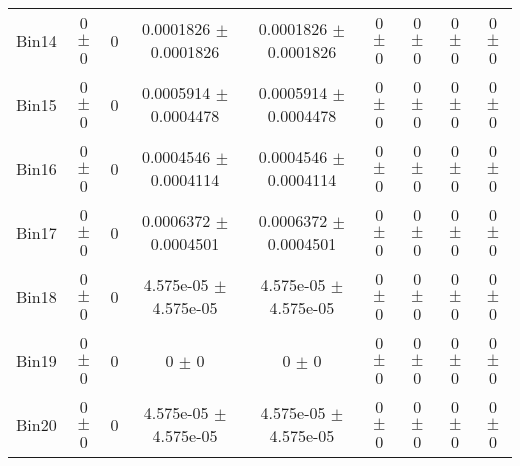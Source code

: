 \begin{tabular}{@{\extracolsep{4pt}}lcccccccc@{}}
     Bin14 & 0 $\pm$ 0 & 0 & 0.0001826 $\pm$ 0.0001826 & 0.0001826 $\pm$ 0.0001826 & 0 $\pm$ 0 & 0 $\pm$ 0 & 0 $\pm$ 0 & 0 $\pm$ 0 \\ 
     Bin15 & 0 $\pm$ 0 & 0 & 0.0005914 $\pm$ 0.0004478 & 0.0005914 $\pm$ 0.0004478 & 0 $\pm$ 0 & 0 $\pm$ 0 & 0 $\pm$ 0 & 0 $\pm$ 0 \\ 
     Bin16 & 0 $\pm$ 0 & 0 & 0.0004546 $\pm$ 0.0004114 & 0.0004546 $\pm$ 0.0004114 & 0 $\pm$ 0 & 0 $\pm$ 0 & 0 $\pm$ 0 & 0 $\pm$ 0 \\ 
     Bin17 & 0 $\pm$ 0 & 0 & 0.0006372 $\pm$ 0.0004501 & 0.0006372 $\pm$ 0.0004501 & 0 $\pm$ 0 & 0 $\pm$ 0 & 0 $\pm$ 0 & 0 $\pm$ 0 \\ 
     Bin18 & 0 $\pm$ 0 & 0 & 4.575e-05 $\pm$ 4.575e-05 & 4.575e-05 $\pm$ 4.575e-05 & 0 $\pm$ 0 & 0 $\pm$ 0 & 0 $\pm$ 0 & 0 $\pm$ 0 \\ 
     Bin19 & 0 $\pm$ 0 & 0 & 0 $\pm$ 0 & 0 $\pm$ 0 & 0 $\pm$ 0 & 0 $\pm$ 0 & 0 $\pm$ 0 & 0 $\pm$ 0 \\ 
     Bin20 & 0 $\pm$ 0 & 0 & 4.575e-05 $\pm$ 4.575e-05 & 4.575e-05 $\pm$ 4.575e-05 & 0 $\pm$ 0 & 0 $\pm$ 0 & 0 $\pm$ 0 & 0 $\pm$ 0 \\ 
\hline\hline
  \end{tabular}
